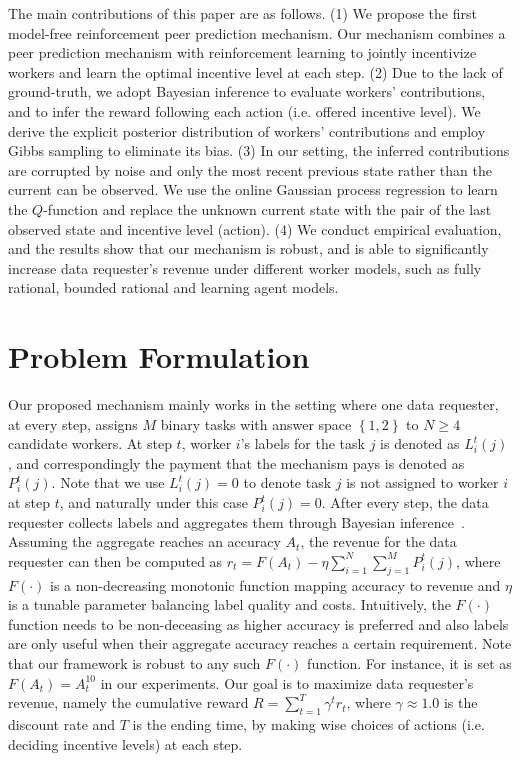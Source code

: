\documentclass{article}
\begin{document}
The main contributions of this paper are as follows.
(1) We propose the first model-free reinforcement peer prediction mechanism.
Our mechanism combines a peer prediction mechanism with reinforcement learning to jointly incentivize workers and learn the optimal incentive level at each step.
(2) Due to the lack of ground-truth, we adopt Bayesian inference to evaluate workers' contributions, and to infer the reward following each action (i.e. offered incentive level). We derive the explicit posterior distribution of workers' contributions and employ Gibbs sampling to eliminate its bias.
(3) In our setting, the inferred contributions are corrupted by noise and only the most recent previous state rather than the current can be observed. We use the online Gaussian process regression to learn the $Q$-function and replace the unknown current state with the pair of the last observed state and incentive level (action).
(4) We conduct empirical evaluation, and the results show that our mechanism is robust, and is able to significantly increase data requester's revenue under different worker models, such as fully rational, bounded rational and learning agent models.

\section{Problem Formulation}
Our proposed mechanism mainly works in the setting where one data requester, at every step, assigns $M$ binary tasks with answer space $\left\{1,2\right\}$ to $N \geq 4$ candidate workers. At step $t$, worker $i$'s labels for the task $j$ is denoted as $L_i^t(j)$, and correspondingly the payment that the mechanism pays is denoted as $P^{t}_i(j)$. Note that we use $L^{t}_i(j)=0$ to denote task $j$ is not assigned to worker $i$ at step $t$, and naturally under this case $P^{t}_i(j)=0$.
After every step, the data requester collects labels and aggregates them through Bayesian inference~\cite{zheng2017truth}.
Assuming the aggregate reaches an accuracy $A_t$,  the revenue for the data requester can then be computed as
$r_t = F(A_t) - \eta {\sum}_{i=1}^{N}{\sum}_{j=1}^{M}P^t_i(j)$,
where $F(\cdot)$ is a non-decreasing monotonic function mapping accuracy to revenue and $\eta$ is a
tunable parameter balancing label quality and costs. Intuitively, the $F(\cdot)$ function needs to be non-deceasing as higher accuracy is preferred and also labels are only useful when their aggregate accuracy reaches a certain requirement. Note that our framework is robust to any such $F(\cdot)$ function. For instance, it is set as $F(A_t)=A^{10}_t$ in our experiments.
Our goal is to maximize data requester's revenue, namely the cumulative reward $R = \sum_{t=1}^{T} \gamma^t r_t$, where $\gamma\approx 1.0$ is the discount rate and $T$ is the ending time, by making wise choices of actions  (i.e. deciding incentive levels) at each step.
\end{document}
